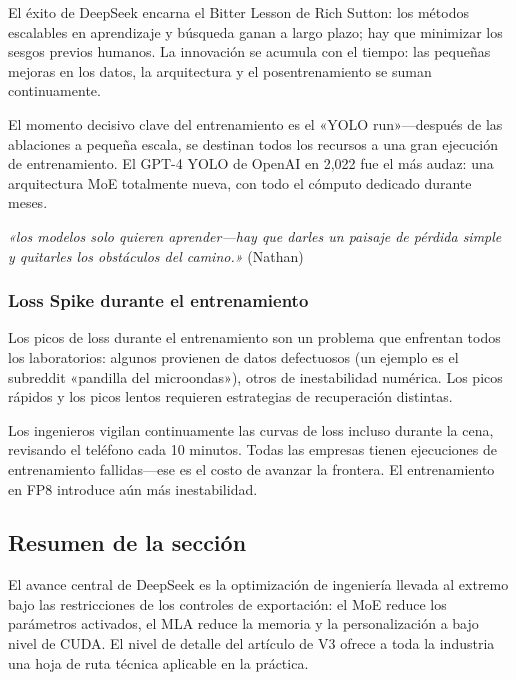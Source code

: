 El éxito de DeepSeek encarna el Bitter Lesson de Rich Sutton: los métodos escalables en aprendizaje y búsqueda ganan a largo plazo; hay que minimizar los sesgos previos humanos. La innovación se acumula con el tiempo: las pequeñas mejoras en los datos, la arquitectura y el posentrenamiento se suman continuamente.

El momento decisivo clave del entrenamiento es el «YOLO run»—después de las ablaciones a pequeña escala, se destinan todos los recursos a una gran ejecución de entrenamiento. El GPT-4 YOLO de OpenAI en 2,022 fue el más audaz: una arquitectura MoE totalmente nueva, con todo el cómputo dedicado durante meses.

\textit{«los modelos solo quieren aprender—hay que darles un paisaje de pérdida simple y quitarles los obstáculos del camino.»} (Nathan)

\subsubsection{Loss Spike durante el entrenamiento}

Los picos de loss durante el entrenamiento son un problema que enfrentan todos los laboratorios: algunos provienen de datos defectuosos (un ejemplo es el subreddit «pandilla del microondas»), otros de inestabilidad numérica. Los picos rápidos y los picos lentos requieren estrategias de recuperación distintas.

Los ingenieros vigilan continuamente las curvas de loss incluso durante la cena, revisando el teléfono cada 10 minutos. Todas las empresas tienen ejecuciones de entrenamiento fallidas—ese es el costo de avanzar la frontera. El entrenamiento en FP8 introduce aún más inestabilidad.

\subsection{Resumen de la sección}

El avance central de DeepSeek es la optimización de ingeniería llevada al extremo bajo las restricciones de los controles de exportación: el MoE reduce los parámetros activados, el MLA reduce la memoria y la personalización a bajo nivel de CUDA. El nivel de detalle del artículo de V3 ofrece a toda la industria una hoja de ruta técnica aplicable en la práctica.
